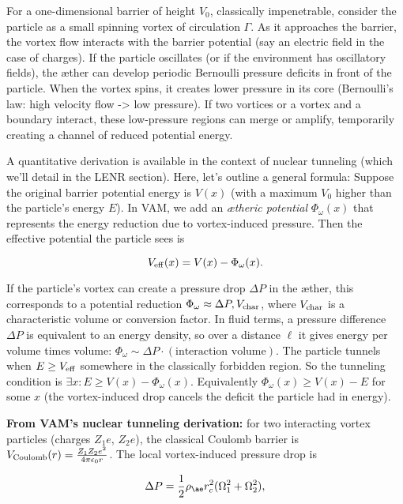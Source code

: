 \documentclass[a4paper, aps,preprint,superscriptaddress, 12pt]{revtex4}
\begin{document}
For a one-dimensional barrier of height $V_0$, classically impenetrable, consider the particle as a small spinning vortex of circulation $\Gamma$. As it approaches the barrier, the vortex flow interacts with the barrier potential (say an electric field in the case of charges). If the particle oscillates (or if the environment has oscillatory fields), the æther can develop periodic Bernoulli pressure deficits in front of the particle. When the vortex spins, it creates lower pressure in its core (Bernoulli’s law: high velocity flow -> low pressure). If two vortices or a vortex and a boundary interact, these low-pressure regions can merge or amplify, temporarily creating a channel of reduced potential energy.


A quantitative derivation is available in the context of nuclear tunneling (which we’ll detail in the LENR section). Here, let’s outline a general formula: Suppose the original barrier potential energy is $V(x)$ (with a maximum $V_0$ higher than the particle’s energy $E$). In VAM, we add an \textit{ætheric potential} $\Phi_\omega(x)$ that represents the energy reduction due to vortex-induced pressure. Then the effective potential the particle sees is

\begin{equation}
    V_{\rm eff}(x) = V(x) - \Phi_\omega(x).
\end{equation}

If the particle’s vortex can create a pressure drop $\Delta P$ in the æther, this corresponds to a potential reduction $\Phi_\omega \approx \Delta P , V_{\rm char}$, where $V_{\rm char}$ is a characteristic volume or conversion factor. In fluid terms, a pressure difference $\Delta P$ is equivalent to an energy density, so over a distance $\ell$ it gives energy per volume times volume: $ \Phi_\omega \sim \Delta P \cdot (\text{interaction volume})$. The particle tunnels when $E \ge V_{\rm eff}$ somewhere in the classically forbidden region. So the tunneling condition is $\exists x: E \ge V(x) - \Phi_\omega(x)$. Equivalently $\Phi_\omega(x) \ge V(x) - E$ for some $x$ (the vortex-induced drop cancels the deficit the particle had in energy).


\textbf{From VAM’s nuclear tunneling derivation:} for two interacting vortex particles (charges $Z_1e$, $Z_2e$), the classical Coulomb barrier is $V_{\rm Coulomb}(r) = \frac{Z_1 Z_2 e^2}{4\pi\epsilon_0 r}$. The local vortex-induced pressure drop is

\begin{equation}
    \Delta P = \frac{1}{2}\rho_{\ae} r_c^2 (\Omega_1^2 + \Omega_2^2),
\end{equation}
\end{document}
